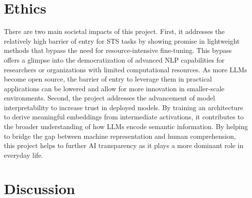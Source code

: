 \documentclass{article}
\begin{document}
\section{Ethics}
There are two main societal impacts of this project. First, it addresses the relatively high barrier of entry for STS tasks by showing promise in lightweight methods that bypass the need for resource-intensive fine-tuning. This bypass offers a glimpse into the democratization of advanced NLP capabilities for researchers or organizations with limited computational resources. As more LLMs become open source, the barrier of entry to leverage them in practical applications can be lowered and allow for more innovation in smaller-scale environments. Second, the project addresses the advancement of model interpretability to increase trust in deployed models. By training an architecture to derive meaningful embeddings from intermediate activations, it contributes to the broader understanding of how LLMs encode semantic information. By helping to bridge the gap between machine representation and human comprehension, this project helps to further AI transparency as it plays a more dominant role in everyday life. 

\section{Discussion}
\end{document}
